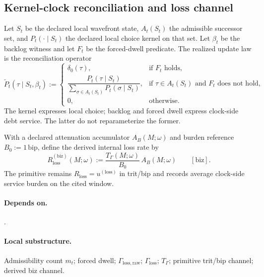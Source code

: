 \subsection{Kernel-clock reconciliation and loss channel}\label{subsec:kernel-clock-rest}
\begin{definition}
\label{def:kernel-clock-reconciliation}
Let $S_t$ be the declared local wavefront state, $A_t(S_t)$ the admissible successor set, and $P_t(\cdot\mid S_t)$ the declared local choice kernel on that set. Let $\beta_t$ be the backlog witness and let $F_t$ be the forced-dwell predicate. The realized update law is the reconciliation operator
\[
\widetilde P_t(\tau\mid S_t,\beta_t):=
\begin{cases}
\delta_0(\tau), & \text{if }F_t\text{ holds},\\[4pt]
\dfrac{P_t(\tau\mid S_t)}{\sum_{\sigma\in A_t(S_t)}P_t(\sigma\mid S_t)}, & \text{if }\tau\in A_t(S_t)\text{ and }F_t\text{ does not hold},\\[8pt]
0, & \text{otherwise.}
\end{cases}
\]
The kernel expresses local choice; backlog and forced dwell express clock-side debt service. The latter do not reparameterize the former.
\end{definition}

\begin{definition}
\label{def:rest-biz}
With a declared attenuation accumulator $A_B(M;\omega)$ and burden reference $B_0:=1\,\mathrm{bip}$, define the derived internal loss rate by
\[
R_{\mathrm{loss}}^{(\mathrm{biz})}(M;\omega):=\frac{T_\Gamma(M;\omega)}{B_0}\,A_B(M;\omega)
\qquad [\mathrm{biz}].
\]
The primitive remains $R_{\mathrm{loss}}=u^{(\mathrm{loss})}$ in trit/bip and records average clock-side service burden on the cited window.
\end{definition}

\paragraph{Depends on.} .
\paragraph{Local substructure.} Admissibility count $m_t$; forced dwell; $\Gamma_{\mathrm{loss,raw}}$; $\Gamma_{\mathrm{loss}}$; $T_\Gamma$; primitive trit/bip channel; derived biz channel.

